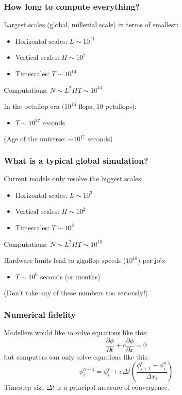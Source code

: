 \documentclass[red]{beamer}
\begin{document}
\begin{frame}
    \frametitle{How long to compute everything?}
    
    Largest scales (global, millenial scale) in terms of smallest:
    \begin{itemize}
        \item Horizontal scales: $L \sim 10^{11}$
        \item Vertical scales: $H \sim 10^7$
        \item Timescales: $T \sim 10^{14}$
    \end{itemize}
    Computations: $N \sim L^2 H T \sim 10^{43}$
    
    \vspace{10pt}
    
    In the petaflop era ($10^{16}$ flops, 10 petaflops):
    \begin{itemize}
        \item $T \sim 10^{27}$ seconds
    \end{itemize}
    (Age of the universe: $\sim 10^{17}$ seconds)

\end{frame}
\begin{frame}
    \frametitle{What is a typical global simulation?}
    
    Current models only resolve the biggest scales:
    \begin{itemize}
        \item Horizontal scales: $L \sim 10^3$
        \item Vertical scales: $H \sim 10^2$
        \item Timescales: $T \sim 10^{8}$
    \end{itemize}
    Computations: $N \sim L^2 H T \sim 10^{16}$
    
    \vspace{10pt}
    
    Hardware limits lead to gigaflop speeds ($10^{10}$) per job:
    \begin{itemize}
        \item $T \sim 10^{6}$ seconds (or months)
    \end{itemize}
    (Don't take any of these numbers too seriously!)

\end{frame}
\begin{frame}
    \frametitle{Numerical fidelity}
    
    Modellers would like to solve equations like this:
    $$
    \frac{\partial \phi}{\partial t} + c \frac{\partial \phi}{\partial x} = 0
    $$
    but computers can only solve equations like this:
    $$
    \phi^{n+1}_i = \phi^n_i + c \Delta t
        \left(\frac{\phi^n_{i+1} - \phi^n_{i}}{\Delta x_i} \right)
    $$
    Timestep size $\Delta t$ is a principal measure of convergence.
\end{frame}
\end{document}
